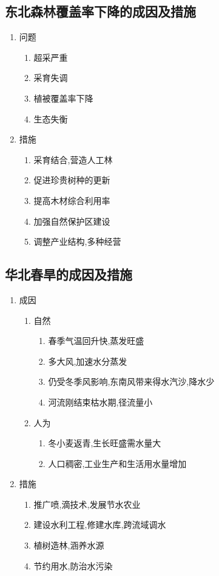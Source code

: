 \documentclass[a4paper]{article}
\begin{document}
    \subsection{东北森林覆盖率下降的成因及措施}
    \begin{enumerate}
        \item 问题
        \begin{enumerate}
            \item 超采严重
            \item 采育失调
            \item 植被覆盖率下降
            \item 生态失衡
        \end{enumerate}
        \item 措施
        \begin{enumerate}
            \item 采育结合,营造人工林
            \item 促进珍贵树种的更新
            \item 提高木材综合利用率
            \item 加强自然保护区建设
            \item 调整产业结构,多种经营
        \end{enumerate}
    \end{enumerate}
    \subsection{华北春旱的成因及措施}
    \begin{enumerate}
        \item 成因
        \begin{enumerate}
            \item 自然
            \begin{enumerate}
                \item 春季气温回升快,蒸发旺盛
                \item 多大风,加速水分蒸发
                \item 仍受冬季风影响,东南风带来得水汽沙,降水少
                \item 河流刚结束枯水期,径流量小
            \end{enumerate}
            \item 人为
            \begin{enumerate}
                \item 冬小麦返青,生长旺盛需水量大
                \item 人口稠密,工业生产和生活用水量增加
            \end{enumerate}
        \end{enumerate}
        \item 措施
        \begin{enumerate}
            \item 推广喷,滴技术,发展节水农业
            \item 建设水利工程,修建水库,跨流域调水
            \item 植树造林,涵养水源
            \item 节约用水,防治水污染
        \end{enumerate}
    \end{enumerate}
\end{document}
